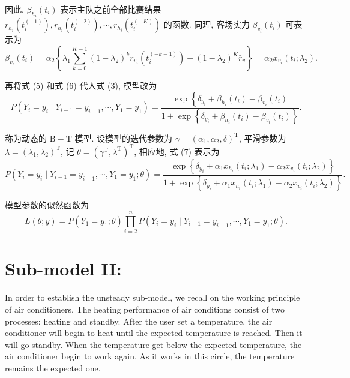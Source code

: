 \documentclass{mcmthesis}
\begin{document}
因此, $\beta_{h_i}\left(t_i\right)$ 表示主队之前全部比赛结果 $r_{h_i}\left(t_i^{(-1)}\right), r_{h_i}\left(t_i^{(-2)}\right), \cdots, r_{h_i}\left(t_i^{(-K)}\right)$ 的函数.
同理, 客场实力 $\beta_{v_i}\left(t_i\right)$ 可表示为
\begin{equation*}
\beta_{v_i}\left(t_i\right)=\alpha_2\left\{\lambda_1 \sum_{k=0}^{K-1}\left(1-\lambda_2\right)^k r_{v_i}\left(t_i^{(-k-1)}\right)+\left(1-\lambda_2\right)^K \bar{r}_v\right\}=\alpha_2 x_{v_i}\left(t_i ; \lambda_2\right) .
\end{equation*}

再将式 (5) 和式 (6) 代人式 (3), 模型改为
\begin{equation*}
P\left(Y_i=y_i \mid Y_{i-1}=y_{i-1}, \cdots, Y_1=y_1\right)=\frac{\exp \left\{\delta_{y_i}+\beta_{h_i}\left(t_i\right)-\beta_{v_i}\left(t_i\right)\right.}{1+\exp \left\{\delta_{y_i}+\beta_{h_i}\left(t_i\right)-\beta_{v_i}\left(t_i\right)\right\}} .
\end{equation*}

称为动态的 $\mathrm{B}-\mathrm{T}$ 模型.
设模型的迭代参数为 $\gamma=\left(\alpha_1, \alpha_2, \delta\right)^{\mathrm{T}}$, 平滑参数为 $\lambda=\left(\lambda_1, \lambda_2\right)^{\mathrm{T}}$, 记 $\theta=\left(\gamma^{\mathrm{T}}, \lambda^{\mathrm{T}}\right)^{\mathrm{T}}$, 相应地, 式 (7) 表示为
\begin{equation*}
P\left(Y_i=y_i \mid Y_{i-1}=y_{i-1}, \cdots, Y_1=y_1 ; \theta\right)=\frac{\exp \left\{\delta_{y_i}+\alpha_1 x_{h_i}\left(t_i ; \lambda_1\right)-\alpha_2 x_{v_i}\left(t_i ; \lambda_2\right)\right\}}{1+\exp \left\{\delta_{y_i}+\alpha_1 x_{h_i}\left(t_i ; \lambda_1\right)-\alpha_2 x_{v_i}\left(t_i ; \lambda_2\right)\right\}} .
\end{equation*}

模型参数的似然函数为
\begin{equation*}
L(\theta ; y)=P\left(Y_1=y_1 ; \theta\right) \prod_{i=2}^n P\left(Y_i=y_i \mid Y_{i-1}=y_{i-1}, \cdots, Y_1=y_1 ; \theta\right) .
\end{equation*}




\section{Sub-model II: }

In order to establish the unsteady sub-model, we recall on the working principle of air conditioners. The heating performance of air conditions consist of two processes: heating and standby. After the user set a temperature, the air conditioner will begin to heat until the expected temperature is reached. Then it will go standby. When the temperature get below the expected temperature, the air conditioner begin to work again. As it works in this circle, the temperature remains the expected one.
\end{document}
